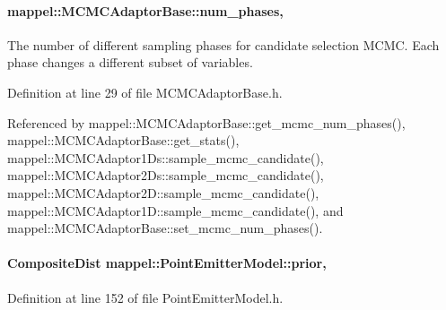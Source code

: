 \paragraph[{\texorpdfstring{num\+\_\+phases}{num_phases}}]{ mappel\+::\+M\+C\+M\+C\+Adaptor\+Base\+::num\+\_\+phases\hspace{0.3cm}{\ttfamily [protected]}, {\ttfamily [inherited]}}\hypertarget{classmappel_1_1MCMCAdaptorBase_a44b90a984ace712584074dc17831fe25}{}\label{classmappel_1_1MCMCAdaptorBase_a44b90a984ace712584074dc17831fe25}
The number of different sampling phases for candidate selection M\+C\+MC. Each phase changes a different subset of variables. 

Definition at line 29 of file M\+C\+M\+C\+Adaptor\+Base.\+h.



Referenced by mappel\+::\+M\+C\+M\+C\+Adaptor\+Base\+::get\+\_\+mcmc\+\_\+num\+\_\+phases(), mappel\+::\+M\+C\+M\+C\+Adaptor\+Base\+::get\+\_\+stats(), mappel\+::\+M\+C\+M\+C\+Adaptor1\+Ds\+::sample\+\_\+mcmc\+\_\+candidate(), mappel\+::\+M\+C\+M\+C\+Adaptor2\+Ds\+::sample\+\_\+mcmc\+\_\+candidate(), mappel\+::\+M\+C\+M\+C\+Adaptor2\+D\+::sample\+\_\+mcmc\+\_\+candidate(), mappel\+::\+M\+C\+M\+C\+Adaptor1\+D\+::sample\+\_\+mcmc\+\_\+candidate(), and mappel\+::\+M\+C\+M\+C\+Adaptor\+Base\+::set\+\_\+mcmc\+\_\+num\+\_\+phases().

\paragraph[{\texorpdfstring{prior}{prior}}]{\setlength{\rightskip}{0pt plus 5cm}Composite\+Dist mappel\+::\+Point\+Emitter\+Model\+::prior\hspace{0.3cm}{\ttfamily [protected]}, {\ttfamily [inherited]}}\hypertarget{classmappel_1_1PointEmitterModel_a393839f8eb1dd3d61c9369377742ba0e}{}\label{classmappel_1_1PointEmitterModel_a393839f8eb1dd3d61c9369377742ba0e}


Definition at line 152 of file Point\+Emitter\+Model.\+h.



